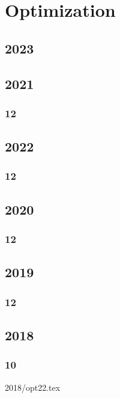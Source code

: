 \documentclass[11pt]{book}
\begin{document}
%


\chapter{Optimization}
\section{2023}

\section{2021}
\subsection{12}

\section{2022}
\subsection{12}

\section{2020}
\subsection{12}

\section{2019}
\subsection{12}




\section{2018}
\subsection{10}
 {2018/opt22.tex}
\end{document}
